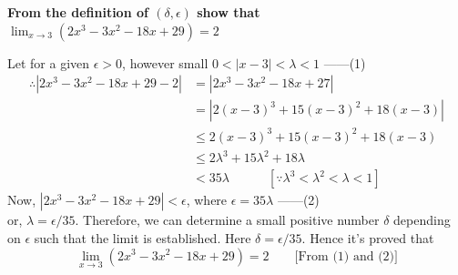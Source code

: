 \documentclass[12pt]{article}
\begin{document}
\begin{example}{\textbf{From the definition of $(\delta,\epsilon)$ show that $\lim_{x \to 3} (2x^3-3x^2-18x+29)=2$}}

    Let for a given $\epsilon>0$, however small $0<|x-3|<\lambda<1$ ------(1)
    \begin{align*}
        \therefore |2x^3-3x^2-18x+29 - 2| &= |2x^3-3x^2-18x+27| \\
        &= |2(x-3)^3 + 15(x-3)^2 + 18(x-3)| \\
        &\le 2(x-3)^3 + 15(x-3)^2 + 18(x-3) \\
        &\le 2\lambda^3 + 15\lambda^2 + 18\lambda \\
        &< 35\lambda \quad\quad\quad [ \because \lambda^3<\lambda^2<\lambda<1 ]
    \end{align*}
    Now, $|2x^3-3x^2-18x+29|<\epsilon$, where $\epsilon=35\lambda$ ------(2) \\
    or, $\lambda=\epsilon/35$. Therefore, we can determine a small positive number $\delta$ depending on $\epsilon$ such that the limit is established. Here $\delta=\epsilon/35$. Hence it's proved that \[
        \lim_{x \to 3} (2x^3-3x^2-18x+29) = 2 \quad\quad \text{[From (1) and (2)]}
    \]
\end{example}

    








    
\end{document}
